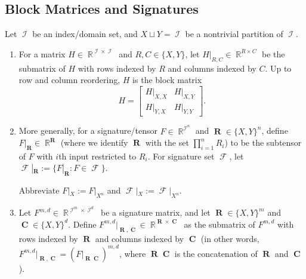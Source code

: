 \documentclass{theoretics}
\DeclareMathOperator{\rr}{\mathbb{R}}
\DeclareMathOperator{\vr}{\mathbf{R}}
\DeclareMathOperator{\vc}{\mathbf{C}}
\DeclareMathOperator{\ic}{\mathcal{I}}
\DeclareMathOperator{\fc}{\mathcal{F}}
\begin{document}
\subsection{Block Matrices and Signatures}
\label{sec:block}
\begin{definition}
    \label{def:block}
    Let $\ic$ be an index/domain set, and $X \sqcup Y = \ic$ be a nontrivial partition of $\ic$.
    \begin{enumerate}
    \item
    For a matrix $H \in \rr^{\ic \times \ic}$ and $R,C \in \{X,Y\}$, let $H|_{R,C} \in \rr^{R\times C}$ be the
    submatrix of $H$ with rows indexed by $R$ and columns indexed by $C$. Up to row and
    column reordering, $H$ is the block matrix
    \[
        H = \begin{bmatrix} H|_{X,X} & H|_{X,Y} \\ H|_{Y,X} & H|_{Y,Y}\end{bmatrix}.
    \]
    \item
    More generally, for a signature/tensor $F \in \rr^{\ic^n}$ and $\vr \in \{X,Y\}^n$, define
    $F|_{\vr} \in \rr^{\vr}$ (where we identify $\vr$ with the set $\prod_{i=1}^n R_i$) to be the subtensor of $F$ with $i$th
    input restricted to $R_i$.
    For signature set $\fc$, let $\fc|_{\vr} := \{F|_{\vr}: F \in \fc\}$.

    Abbreviate $F|_X := F|_{X^n}$ and $\fc|_X := \fc|_{X^n}$.
    \item 
    Let $F^{m,d} \in \rr^{\ic^m \times \ic^d}$ be a signature matrix, and let 
    $\vr \in \{X,Y\}^m$ and $\vc \in \{X,Y\}^d$. Define 
    $F^{m,d}|_{\vr,\vc} \in \rr^{\vr \times \vc}$
    as the submatrix of $F^{m,d}$ with rows indexed by $\vr$ and columns indexed by
    $\vc$ (in other words, $F^{m,d}|_{\vr,\vc} = (F|_{\vr\vc})^{m,d}$, where
    $\vr\vc$ is the concatenation of $\vr$ and $\vc$).
    \end{enumerate}
\end{definition}
\end{document}
